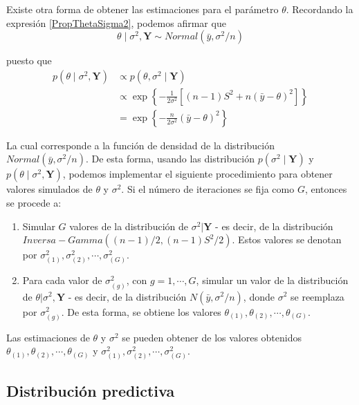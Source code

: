 \documentclass[
  10pt,
  spanish,
]{book}
\providecommand{\tightlist}{%
  \setlength{\itemsep}{0pt}\setlength{\parskip}{0pt}}
\theoremstyle{definition}
\theoremstyle{definition}
\theoremstyle{definition}
\theoremstyle{definition}
\theoremstyle{remark}
\begin{document}
Existe otra forma de obtener las estimaciones para el parámetro \(\theta\). Recordando la expresión \ref{PropThetaSigma2}, podemos afirmar que
\begin{equation*}
\theta \mid \sigma^2, \mathbf{Y} \sim Normal(\bar{y},\sigma^2/n)
\end{equation*}

puesto que
\begin{align*}
p(\theta \mid \sigma^2,\mathbf{Y})&\propto p(\theta, \sigma^2 \mid\mathbf{Y})\\
&\propto\exp\left\{-\frac{1}{2\sigma^2}\left[(n-1)S^2+n(\bar{y}-\theta)^2\right]\right\}\\
&=\exp\left\{-\frac{n}{2\sigma^2}(\bar{y}-\theta)^2\right\}
\end{align*}

La cual corresponde a la función de densidad de la distribución \(Normal(\bar{y},\sigma^2/n)\). De esta forma, usando las distribución \(p(\sigma^2\mid\mathbf{Y})\) y \(p(\theta\mid\sigma^2,\mathbf{Y})\), podemos implementar el siguiente procedimiento para obtener valores simulados de \(\theta\) y \(\sigma^2\). Si el número de iteraciones se fija como \(G\), entonces se procede a:

\begin{enumerate}
\def\labelenumi{\arabic{enumi}.}
\tightlist
\item
  Simular \(G\) valores de la distribución de \(\sigma^2|\mathbf{Y}\) - es decir, de la distribución \(Inversa-Gamma((n-1)/2,(n-1)S^2/2)\). Estos valores se denotan por \(\sigma^2_{(1)},\sigma^2_{(2)},\cdots,\sigma^2_{(G)}\).
\item
  Para cada valor de \(\sigma^2_{(g)}\), con \(g=1,\cdots,G\), simular un valor de la distribución de \(\theta|\sigma^2,\mathbf{Y}\) - es decir, de la distribución \(N(\bar{y},\sigma^2/n)\), donde \(\sigma^2\) se reemplaza por \(\sigma^2_{(g)}\). De esta forma, se obtiene los valores \(\theta_{(1)},\theta_{(2)},\cdots,\theta_{(G)}\).
\end{enumerate}

Las estimaciones de \(\theta\) y \(\sigma^2\) se pueden obtener de los valores obtenidos \(\theta_{(1)},\theta_{(2)},\cdots,\theta_{(G)}\) y \(\sigma^2_{(1)},\sigma^2_{(2)},\cdots,\sigma^2_{(G)}\).

\hypertarget{distribuciuxf3n-predictiva}{%
\subsection{Distribución predictiva}\label{distribuciuxf3n-predictiva}}
\end{document}
